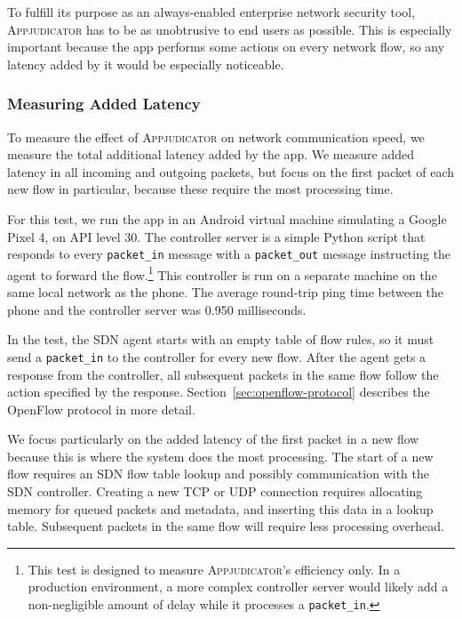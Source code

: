 To fulfill its purpose as an always-enabled enterprise network security tool,
\textsc{Appjudicator} has to be as unobtrusive to end users as possible. This is
especially important because the app performs some actions on every network
flow, so any latency added by it would be especially noticeable.

\subsubsection{Measuring Added Latency}
\label{sec:measuring-added-latency}

To measure the effect of \textsc{Appjudicator} on network communication speed,
we measure the total additional latency added by the app. We measure added
latency in all incoming and outgoing packets, but focus on the first packet of
each new flow in particular, because these require the most processing time.

For this test, we run the app in an Android virtual machine simulating a Google
Pixel 4, on API level 30. The controller server is a simple Python script that
responds to every \texttt{packet\_in} message with a \texttt{packet\_out}
message instructing the agent to forward the flow.\footnote{This test is
	designed to measure \textsc{Appjudicator}'s efficiency only. In a production
	environment, a more complex controller server would likely add a
	non-negligible amount of delay while it processes a \texttt{packet\_in}.}
This controller is run on a separate machine on the same local network as the
phone. The average round-trip ping time between the phone and the controller
server was 0.950 milliseconds.

In the test, the SDN agent starts with an empty table of flow rules, so it must
send a \texttt{packet\_in} to the controller for every new flow. After the agent
gets a response from the controller, all subsequent packets in the same flow
follow the action specified by the response.
Section~\ref{sec:openflow-protocol} describes the OpenFlow protocol in more
detail.

We focus particularly on the added latency of the first packet in a new flow
because this is where the system does the most processing. The start of a new
flow requires an SDN flow table lookup and possibly communication with the SDN
controller. Creating a new TCP or UDP connection requires allocating memory for
queued packets and metadata, and inserting this data in a lookup table.
Subsequent packets in the same flow will require less processing overhead.


